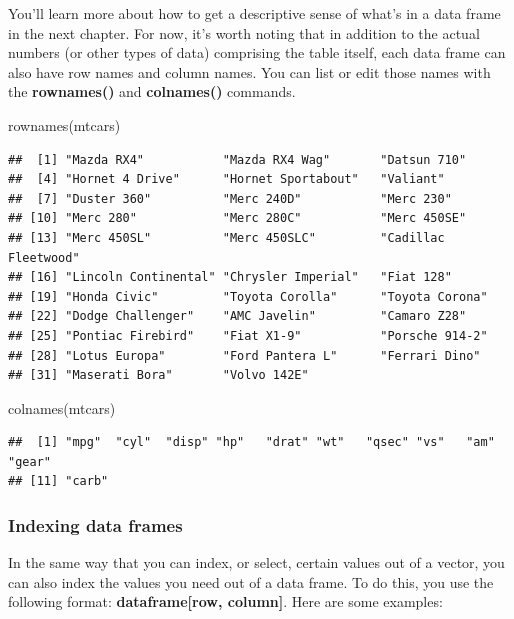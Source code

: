 \documentclass[
]{book}
\newenvironment{Shaded}{\begin{snugshade}}{\end{snugshade}}
\newcommand{\FunctionTok}[1]{\textcolor[rgb]{0.00,0.00,0.00}{#1}}
\newcommand{\NormalTok}[1]{#1}
\begin{document}
You'll learn more about how to get a descriptive sense of what's in a data frame in the next chapter. For now, it's worth noting that in addition to the actual numbers (or other types of data) comprising the table itself, each data frame can also have row names and column names. You can list or edit those names with the \textbf{rownames()} and \textbf{colnames()} commands.

\begin{Shaded}
\begin{Highlighting}[]
\FunctionTok{rownames}\NormalTok{(mtcars)}
\end{Highlighting}
\end{Shaded}

\begin{verbatim}
##  [1] "Mazda RX4"           "Mazda RX4 Wag"       "Datsun 710"         
##  [4] "Hornet 4 Drive"      "Hornet Sportabout"   "Valiant"            
##  [7] "Duster 360"          "Merc 240D"           "Merc 230"           
## [10] "Merc 280"            "Merc 280C"           "Merc 450SE"         
## [13] "Merc 450SL"          "Merc 450SLC"         "Cadillac Fleetwood" 
## [16] "Lincoln Continental" "Chrysler Imperial"   "Fiat 128"           
## [19] "Honda Civic"         "Toyota Corolla"      "Toyota Corona"      
## [22] "Dodge Challenger"    "AMC Javelin"         "Camaro Z28"         
## [25] "Pontiac Firebird"    "Fiat X1-9"           "Porsche 914-2"      
## [28] "Lotus Europa"        "Ford Pantera L"      "Ferrari Dino"       
## [31] "Maserati Bora"       "Volvo 142E"
\end{verbatim}

\begin{Shaded}
\begin{Highlighting}[]
\FunctionTok{colnames}\NormalTok{(mtcars)}
\end{Highlighting}
\end{Shaded}

\begin{verbatim}
##  [1] "mpg"  "cyl"  "disp" "hp"   "drat" "wt"   "qsec" "vs"   "am"   "gear"
## [11] "carb"
\end{verbatim}

\hypertarget{indexing-data-frames}{%
\subsubsection{Indexing data frames}\label{indexing-data-frames}}

In the same way that you can index, or select, certain values out of a vector, you can also index the values you need out of a data frame. To do this, you use the following format: \textbf{dataframe{[}row, column{]}}. Here are some examples:
\end{document}
